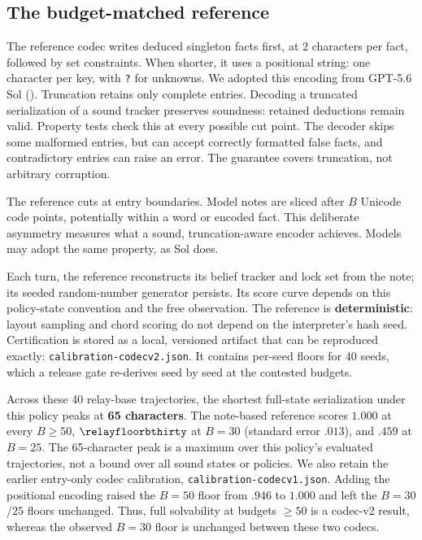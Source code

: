 \subsection{The budget-matched reference}\label{sec:reference}

The reference codec writes deduced singleton facts first, at 2 characters per fact, followed by set constraints. When shorter, it uses a positional string: one character per key, with \texttt{?} for unknowns. We adopted this encoding from GPT-5.6 Sol (). Truncation retains only complete entries. Decoding a truncated serialization of a sound tracker preserves soundness: retained deductions remain valid. Property tests check this at every possible cut point. The decoder skips some malformed entries, but can accept correctly formatted false facts, and contradictory entries can raise an error. The guarantee covers truncation, not arbitrary corruption.

The reference cuts at entry boundaries. Model notes are sliced after $B$ Unicode code points, potentially within a word or encoded fact. This deliberate asymmetry measures what a sound, truncation-aware encoder achieves. Models may adopt the same property, as Sol does.

Each turn, the reference reconstructs its belief tracker and lock set from the note; its seeded random-number generator persists. Its score curve depends on this policy-state convention and the free observation. The reference is \textbf{deterministic}: layout sampling and chord scoring do not depend on the interpreter's hash seed. Certification is stored as a local, versioned artifact that can be reproduced exactly: \texttt{calibration-codecv2.json}. It contains per-seed floors for 40 seeds, which a release gate re-derives seed by seed at the contested budgets.

Across these 40 relay-base trajectories, the shortest full-state serialization under this policy peaks at \textbf{65 characters}. The note-based reference scores $1.000$ at every $B \geq 50$, $\relayfloorbthirty$ at $B{=}30$ (standard error $.013$), and $.459$ at $B{=}25$. The 65-character peak is a maximum over this policy's evaluated trajectories, not a bound over all sound states or policies. We also retain the earlier entry-only codec calibration, \texttt{calibration-codecv1.json}. Adding the positional encoding raised the $B{=}50$ floor from $.946$ to $1.000$ and left the $B{=}30$/$25$ floors unchanged. Thus, full solvability at budgets $\geq 50$ is a codec-v2 result, whereas the observed $B{=}30$ floor is unchanged between these two codecs.

